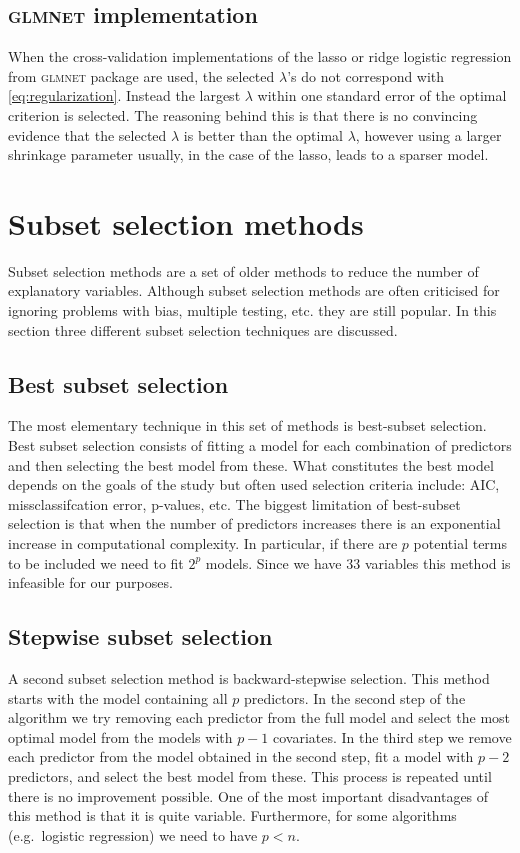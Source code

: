 \subsection{\textsc{glmnet} implementation}
When the cross-validation implementations of the lasso or ridge logistic regression from \textsc{glmnet} package are used, the selected $\lambda$'s do not correspond with \ref{eq:regularization}. Instead the largest $\lambda$ within one standard error of the optimal criterion is selected. The reasoning behind this is that there is no convincing evidence that the selected $\lambda$ is better than the optimal $\lambda$, however using a larger shrinkage parameter usually, in the case of the lasso, leads to a sparser model.
\section{Subset selection methods}
\label{sec:SubsetSelectionMethods}
Subset selection methods are a set of older methods to reduce the number of explanatory variables. Although subset selection methods are often criticised for ignoring problems with bias, multiple testing, etc. \parencite{whittingham_why_2006} they are still popular. In this section three different subset selection techniques are discussed. \\

\subsection{Best subset selection}
The most elementary technique in this set of methods is best-subset selection. Best subset selection consists of fitting a model for each combination of predictors and then selecting the best model from these. What constitutes the best model depends on the goals of the study but often used selection criteria include: AIC, missclassifcation error, p-values, etc. The biggest limitation of best-subset selection is that when the number of predictors increases there is an exponential increase in computational complexity. In particular, if there are $p$ potential terms to be included we need to fit $2^p$ models. Since we have $33$ variables this method is infeasible for our purposes.\\

\subsection{Stepwise subset selection}
A second subset selection method is backward-stepwise selection. This method starts with the model containing all $p$ predictors. In the second step of the algorithm we try removing each predictor from the full model and select the most optimal model from the models with $p-1$ covariates. In the third step we remove each predictor from the model obtained in the second step, fit a model with $p-2$ predictors, and select the best model from these. This process is repeated until there is no improvement possible. One of the most important disadvantages of this method is that it is quite variable. Furthermore, for some algorithms (e.g.\ logistic regression) we need to have $p < n$.
\\

